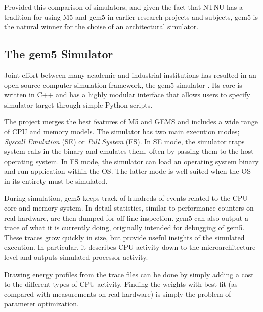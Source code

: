 Provided this comparison of simulators, and given the fact that NTNU has a tradition
for using M5 and gem5 in earlier research projects and subjects, gem5 is the natural
winner for the choise of an architectural simulator.



\subsection{The gem5 Simulator}

Joint effort between many academic and industrial institutions has resulted in
an open source computer simulation framework, the gem5 simulator \cite{gem5,gem5simulator}.
Its core is written in C++ and has a highly modular interface that allows users
to specify simulator target through simple Python scripts.

The project merges the best features of M5 \cite{binkert2006m5} and GEMS \cite{GEMS} and
includes a wide range of CPU and memory models\cite{gem5hipeac}. The simulator has two main
execution modes; \textit{Syscall Emulation} (SE) or \textit{Full System} (FS).
In SE mode, the simulator traps system calls in the binary and emulates them,
often by passing them to the host operating system. In FS mode, the simulator
can load an operating system binary and run application within the OS. The
latter mode is well suited when the OS in its entirety must be simulated.


During simulation, gem5 keeps track of hundreds of events related to the CPU
core and memory system. In-detail statistics, similar to performance counters on
real hardware, are then dumped for off-line inspection. gem5 can also output a
trace of what it is currently doing, originally intended for debugging of gem5.
These traces grow quickly in size, but provide useful insights of the simulated
execution. In particular, it describes CPU activity down to the
microarchitecture level and outputs simulated processor activity.

Drawing energy profiles from the trace files can be done by simply adding a cost
to the different types of CPU activity. Finding the weights with best fit
(as compared with measurements on real hardware) is simply the problem of
parameter optimization.
